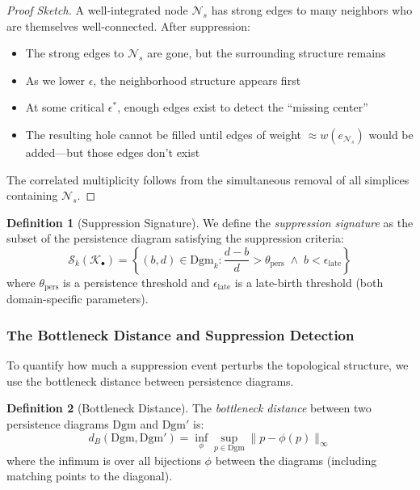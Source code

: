 \documentclass[12pt,a4paper]{article}
\theoremstyle{definition}
\newtheorem{definition}{Definition}[section]
\theoremstyle{remark}
\newcommand{\NS}{\mathcal{N}_s}          %
\begin{document}
\begin{proof}[Proof Sketch]
A well-integrated node $\NS$ has strong edges to many neighbors who are themselves well-connected. After suppression:
\begin{itemize}
    \item The strong edges to $\NS$ are gone, but the surrounding structure remains
    \item As we lower $\epsilon$, the neighborhood structure appears first
    \item At some critical $\epsilon^*$, enough edges exist to detect the ``missing center''
    \item The resulting hole cannot be filled until edges of weight $\approx w(e_{\NS})$ would be added—but those edges don't exist
\end{itemize}
The correlated multiplicity follows from the simultaneous removal of all simplices containing $\NS$.
\end{proof}

\begin{definition}[Suppression Signature]
We define the \emph{suppression signature} as the subset of the persistence diagram satisfying the suppression criteria:
\begin{equation}
    \boxed{
    \mathcal{S}_k(\mathcal{K}_\bullet) = \left\{ (b, d) \in \text{Dgm}_k : \frac{d - b}{d} > \theta_{\text{pers}} \;\land\; b < \epsilon_{\text{late}} \right\}
    }
\end{equation}
where $\theta_{\text{pers}}$ is a persistence threshold and $\epsilon_{\text{late}}$ is a late-birth threshold (both domain-specific parameters).
\end{definition}

\subsubsection{The Bottleneck Distance and Suppression Detection}

To quantify how much a suppression event perturbs the topological structure, we use the bottleneck distance between persistence diagrams.

\begin{definition}[Bottleneck Distance]
The \emph{bottleneck distance} between two persistence diagrams $\text{Dgm}$ and $\text{Dgm}'$ is:
\begin{equation}
    d_B(\text{Dgm}, \text{Dgm}') = \inf_{\phi} \sup_{p \in \text{Dgm}} \| p - \phi(p) \|_\infty
\end{equation}
where the infimum is over all bijections $\phi$ between the diagrams (including matching points to the diagonal).
\end{definition}
\end{document}

